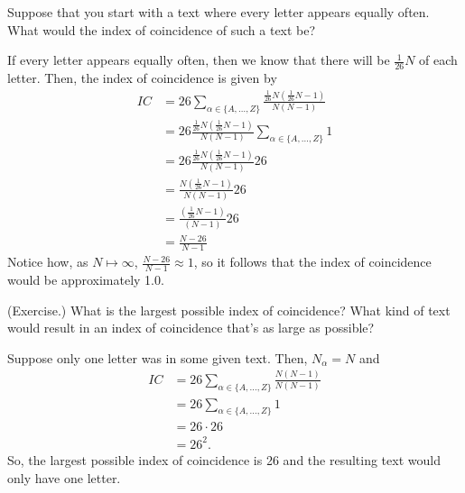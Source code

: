 \documentclass[letterpaper]{article}
\begin{document}
\begin{mdframed}
    Suppose that you start with a text where every letter appears equally often. What would the index of coincidence of such a text be?

    \begin{mdframed}
        If every letter appears equally often, then we know that there will be $\frac{1}{26}N$ of each letter. Then, the index of coincidence is given by 
        \begin{equation*}
            \begin{aligned}
                IC &= 26 \sum_{\alpha \in \{A, \dots, Z\}} \frac{\frac{1}{26}N (\frac{1}{26}N - 1)}{N(N - 1)} \\ 
                    &= 26 \frac{\frac{1}{26}N (\frac{1}{26}N - 1)}{N(N - 1)}  \sum_{\alpha \in \{A, \dots, Z\}} 1 \\ 
                    &= 26 \frac{\frac{1}{26}N (\frac{1}{26}N - 1)}{N(N - 1)} 26 \\ 
                    &= \frac{N (\frac{1}{26}N - 1)}{N(N - 1)} 26 \\ 
                    &=  \frac{(\frac{1}{26}N - 1)}{(N - 1)} 26 \\ 
                    &= \frac{N - 26}{N - 1} 
            \end{aligned}
        \end{equation*}
        Notice how, as $N \mapsto \infty$, $\frac{N - 26}{N - 1} \approx 1$, so it follows that the index of coincidence would be approximately 1.0.
    \end{mdframed}
\end{mdframed}


\begin{mdframed}
    (Exercise.) What is the largest possible index of coincidence? What kind of text would result in an index of coincidence that's as large as possible?

    \begin{mdframed}
        Suppose only one letter was in some given text. Then, $N_\alpha = N$ and 
        \begin{equation*}
            \begin{aligned}
                IC &= 26 \sum_{\alpha \in \{A, \hdots, Z\}} \frac{N (N - 1)}{N(N - 1)} \\ 
                    &= 26 \sum_{\alpha \in \{A, \hdots, Z\}} 1 \\ 
                    &= 26 \cdot 26 \\ 
                    &= 26^2.
            \end{aligned}
        \end{equation*}
        So, the largest possible index of coincidence is 26 and the resulting text would only have one letter.
    \end{mdframed}
\end{mdframed}
\end{document}
